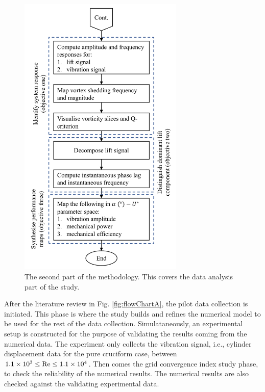 \documentclass[oneside]{utmthesis}
\begin{document}
\begin{figure}[!h]
  \centering
  \hspace{1cm} \includegraphics[width=0.7\textwidth]{figs/flowChartB}
  \caption{The second part of the methodology. This covers the data analysis part of the study.}
  \label{fig:flowChartB}
\end{figure}

\noindent After the literature review in Fig. \ref{fig:flowChartA}, the pilot data collection is initiated. This phase is where the study builds and refines the numerical model to be used for the rest of the data collection. Simulataneously, an experimental setup is constructed for the purpose of validating the results coming from the numerical data. The experiment only collects the vibration signal, i.e., cylinder displacement data for the pure cruciform case, between $1.1 \times 10^{3} \leq \text{Re} \leq 1.1 \times 10^{4}$. Then comes the grid convergence index study phase, to check the reliability of the numerical results. The numerical results are also checked against the validating experimental data.
\end{document}
